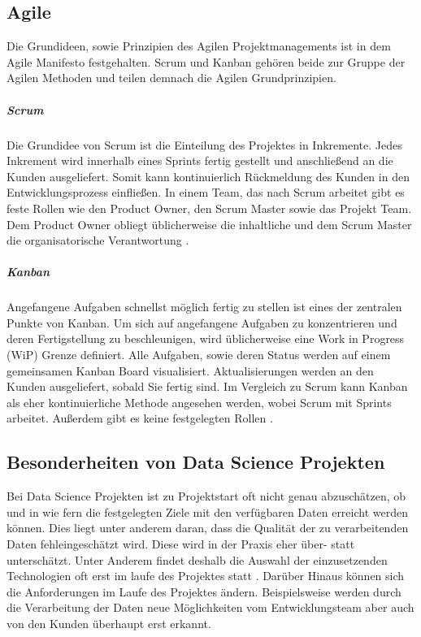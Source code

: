 \documentclass[twocolumn,10pt]{asme2ej}
\begin{document}
\subsection{Agile}
Die Grundideen, sowie Prinzipien des Agilen Projektmanagements ist in dem Agile Manifesto  \cite{beck2001agile} festgehalten. Scrum und Kanban gehören beide zur Gruppe der Agilen Methoden und teilen demnach die Agilen Grundprinzipien.

\subparagraph{Scrum}
Die Grundidee von Scrum ist die Einteilung des Projektes in Inkremente. Jedes Inkrement wird innerhalb eines Sprints fertig gestellt und anschließend an die Kunden ausgeliefert. Somit kann kontinuierlich Rückmeldung des Kunden in den Entwicklungsprozess einfließen. In einem Team, das nach Scrum arbeitet gibt es feste Rollen wie den Product Owner, den Scrum Master sowie das Projekt Team. Dem Product Owner obliegt üblicherweise die inhaltliche und dem Scrum Master die organisatorische Verantwortung \cite{scrum}.

\subparagraph{Kanban}
Angefangene Aufgaben schnellst möglich fertig zu stellen ist eines der zentralen Punkte von Kanban. Um sich auf angefangene Aufgaben zu konzentrieren und deren Fertigstellung zu beschleunigen, wird üblicherweise eine Work in Progress (WiP) Grenze definiert. Alle Aufgaben, sowie deren Status werden auf einem gemeinsamen Kanban Board visualisiert. Aktualisierungen werden an den Kunden ausgeliefert, sobald Sie fertig sind. Im Vergleich zu Scrum kann Kanban als eher kontinuierliche Methode angesehen werden, wobei Scrum mit Sprints arbeitet. Außerdem gibt es keine festgelegten Rollen \cite{kanban}.

\subsection{Besonderheiten von Data Science Projekten}
Bei Data Science Projekten ist zu Projektstart oft nicht genau abzuschätzen, ob und in wie fern die festgelegten Ziele mit den verfügbaren Daten erreicht werden können. Dies liegt unter anderem daran, dass die Qualität der zu verarbeitenden Daten fehleingeschätzt wird. Diese wird in der Praxis eher über- statt unterschätzt. Unter Anderem findet deshalb die Auswahl der einzusetzenden Technologien oft erst im laufe des Projektes statt \cite{agile_pm}. Darüber Hinaus können sich die Anforderungen im Laufe des Projektes ändern. Beispielsweise werden durch die Verarbeitung der Daten neue Möglichkeiten vom Entwicklungsteam aber auch von den Kunden überhaupt erst erkannt. 
\end{document}
